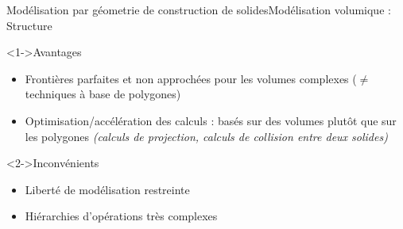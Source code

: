 \documentclass{beamer}
\begin{document}
\begin{frame}[c]{Modélisation par géometrie de construction de solides}{Modélisation volumique : Structure}

\newline

\begin{block}<1->{Avantages}
    \begin{itemize}
    \item Frontières parfaites et non approchées pour les volumes complexes         \newline ($\ne$ techniques à base de polygones)
    \newline
    \item Optimisation/accélération des calculs : 
    \newline basés sur des volumes plutôt que sur les polygones
    \newline \textit{(calculs de projection, calculs de collision entre deux solides)}
    \end{itemize}
\end{block}
\newline
\begin{block}<2->{Inconvénients}
     \begin{itemize}
    \item Liberté de modélisation restreinte 
    \newline
    \item Hiérarchies d'opérations très complexes 
     \end{itemize}
\end{block}

\end{frame}
\end{document}
